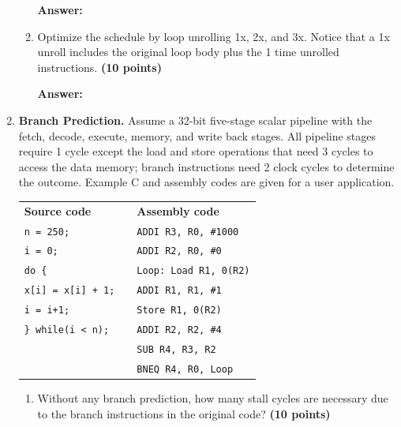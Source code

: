 \documentclass[a4paper, 11pt]{exam}
\begin{document}
\begin{center}
\begin{enumerate}
\begin{enumerate}
	\hfill
 
\textbf{Answer:} 

\hfill
	
	\item Optimize the schedule by loop unrolling 1x, 2x, and 3x. Notice that a 1x unroll includes the original loop body plus the 1 time unrolled instructions. \textbf{(10 points)}
	
	\hfill
 
\textbf{Answer:} 

\hfill


\end{enumerate}

\item \textbf{Branch Prediction.}
Assume a 32-bit five-stage scalar pipeline with the fetch, decode, execute, memory, and write back stages.
All pipeline stages require 1 cycle except the load and store operations that need 3 cycles to access the data memory; branch instructions need 2 clock cycles to determine the outcome.
Example C and assembly codes are given for a user application.

\begin{tabular}{lll}
	\textbf{Source code} & & \textbf{Assembly code }\\
	\texttt{n = 250;}&  &\hspace{40pt}\texttt{ADDI R3, R0, \#1000} \\
	\texttt{i = 0;} &  &\hspace{40pt}\texttt{ADDI R2, R0, \#0}\\
	\texttt{do \{} &  &\texttt{Loop: Load  R1, 0(R2)} \\
	\hspace{20pt}\texttt{x[i] = x[i] + 1;}&  &\hspace{40pt}\texttt{ADDI   R1, R1, \#1}\\
	\hspace{20pt}\texttt{i = i+1;}&  &\hspace{40pt}\texttt{Store  R1, 0(R2)}\\
	\texttt{\} while(i < n);}&  &\hspace{40pt}\texttt{ADDI R2, R2, \#4}\\
	&  &\hspace{40pt}\texttt{SUB R4, R3, R2}\\
	&  &\hspace{40pt}\texttt{BNEQ R4, R0, Loop}\\
\end{tabular}

\begin{enumerate}
	\item  Without any branch prediction, how many stall cycles are necessary due to the branch instructions in the original code? \textbf {(10 points)}
	

\end{enumerate}
\end{enumerate}
\end{center}
\end{document}
